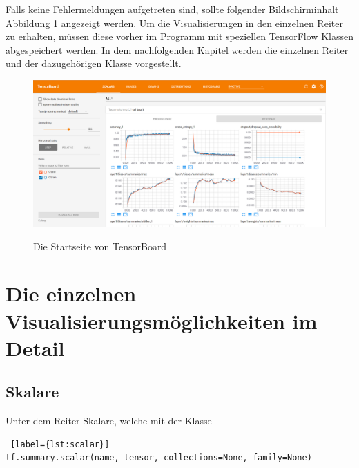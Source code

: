 Falls keine Fehlermeldungen aufgetreten sind, sollte folgender Bildschirminhalt Abbildung \ref{fig:tensorboard_start} angezeigt werden. Um die Visualisierungen in den einzelnen Reiter zu erhalten, müssen diese vorher im Programm mit speziellen TensorFlow Klassen abgespeichert werden. In dem nachfolgenden Kapitel werden die einzelnen Reiter und der dazugehörigen Klasse vorgestellt. 
\\[1ex]

\begin{figure}[h!]
	\centering
	 \includegraphics[width=1\textwidth]{images/Kapitel_3/TensorBoard_start.png}\\
	\vspace{10pt} 
	\caption[Die Startseite von TensorBoard]{Die Startseite von TensorBoard}
	\label{fig:tensorboard_start}
\end{figure}





\section{Die einzelnen Visualisierungsmöglichkeiten im Detail}

\subsection{Skalare}
\vspace{10pt}
Unter dem Reiter Skalare, welche mit der Klasse
\\

\begin{minipage}{\linewidth}
\begin{lstlisting} [label={lst:scalar}]
tf.summary.scalar(name, tensor, collections=None, family=None)
\end{lstlisting}
\end{minipage}

